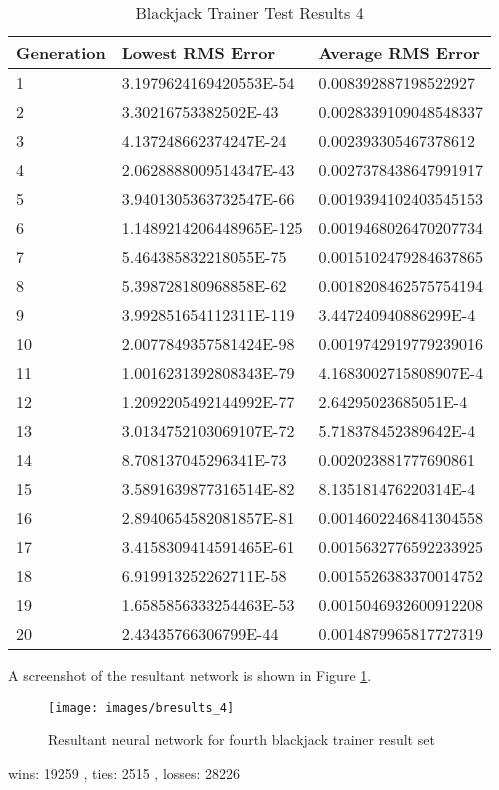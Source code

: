\begin{center}
    \begin{longtable}{ | l | l | l |}
      \caption{Blackjack Trainer Test Results 4} \label{btr4} \\
   \hline
  Generation & Lowest RMS Error & Average RMS Error \\ \hline
1 &	3.1979624169420553E-54 &	0.008392887198522927 \\ \hline
2 &	3.30216753382502E-43 &	0.0028339109048548337 \\ \hline
3 &	4.137248662374247E-24 &	0.002393305467378612 \\ \hline
4 &	2.0628888009514347E-43 &	0.0027378438647991917 \\ \hline
5 &	3.9401305363732547E-66 &	0.0019394102403545153 \\ \hline
6 &	1.1489214206448965E-125 &	0.0019468026470207734 \\ \hline
7 &	5.464385832218055E-75 &	0.0015102479284637865 \\ \hline
8 &	5.398728180968858E-62 &	0.0018208462575754194 \\ \hline
9 &	3.992851654112311E-119 &	3.447240940886299E-4 \\ \hline
10 &	2.0077849357581424E-98 &	0.0019742919779239016 \\ \hline
11 &	1.0016231392808343E-79 &	4.1683002715808907E-4 \\ \hline
12 &	1.2092205492144992E-77 &	2.64295023685051E-4 \\ \hline
13 &	3.0134752103069107E-72 &	5.718378452389642E-4 \\ \hline
14 &	8.708137045296341E-73 &	0.002023881777690861 \\ \hline
15 &	3.5891639877316514E-82 &	8.135181476220314E-4 \\ \hline
16 &	2.8940654582081857E-81 &	0.0014602246841304558 \\ \hline
17 &	3.4158309414591465E-61 &	0.0015632776592233925 \\ \hline
18 &	6.919913252262711E-58 &	0.0015526383370014752 \\ \hline
19 &	1.6585856333254463E-53 &	0.0015046932600912208 \\ \hline
20 &	2.43435766306799E-44 &	0.0014879965817727319 \\ \hline
\end{longtable}
\end{center}

A screenshot of the resultant network is shown in Figure \ref{bresults_4}.

\begin{figure}[h!]
  \centering
  \texttt{[image: images/bresults\_4]}
  \caption{Resultant neural network for fourth blackjack trainer result set}
  \label{bresults_4}
\end{figure}

wins:  19259 , ties:  2515 , losses:  28226


